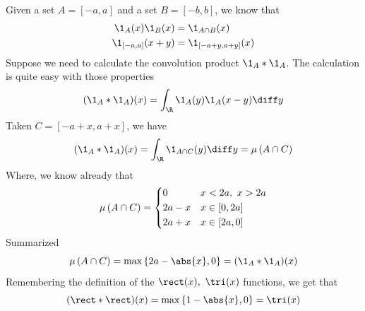 \documentclass[../mmf.tex]{subfiles}
\begin{document}
\begin{eg}
	Given a set $A=[-a,a]$ and a set $B=[-b,b]$, we know that
	\begin{equation*}
		\begin{aligned}
			\1_A(x)\1_B(x)&=\1_{A\cap B}(x)\\
			\1_{[-a,a]}(x+y)&=\1_{[-a+y,a+y]}(x)
		\end{aligned}
	\end{equation*}
	Suppose we need to calculate the convolution product $\1_A*\1_A$. The calculation is quite easy with those properties
	\begin{equation*}
		(\1_A*\1_A)(x)=\int_{\R}^{}\1_A(y)\1_A(x-y)\diff y
	\end{equation*}
	Taken $C=[-a+x,a+x]$, we have
	\begin{equation*}
		(\1_A*\1_A)(x)=\int_{\R}^{}\1_{A\cap C}(y)\diff y=\mu\left( A\cap C \right)
	\end{equation*}
	Where, we know already that
	\begin{equation*}
		\mu\left( A\cap C \right)=\begin{dcases}0&x<2a,\ x>2a\\2a-x&x\in[0,2a]\\2a+x&x\in[2a,0]\end{dcases}
	\end{equation*}
	Summarized
	\begin{equation*}
		\mu\left( A\cap C \right)=\max\left\{ 2a-\abs{x},0 \right\}=(\1_A*\1_A)(x)
	\end{equation*}
	Remembering the definition of the $\rect(x),\ \tri(x)$ functions, we get that
	\begin{equation*}
		(\rect*\rect)(x)=\max\left\{ 1-\abs{x},0 \right\}=\tri(x)
	\end{equation*}
\end{eg}
\end{document}
